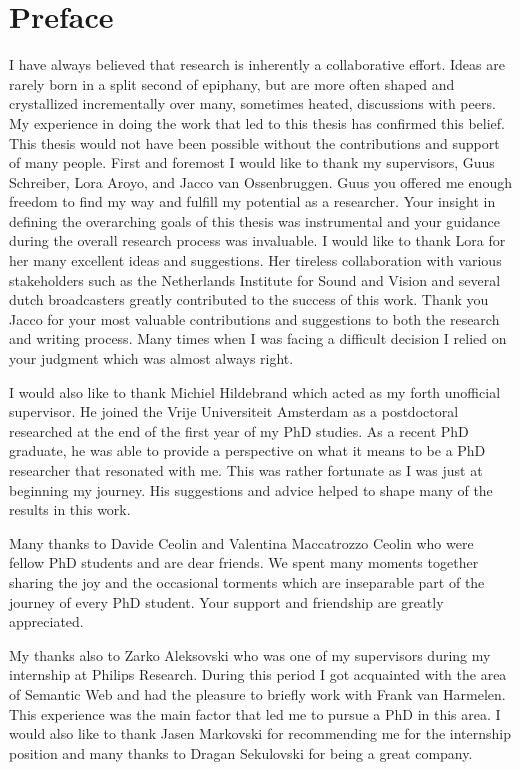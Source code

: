 \chapter{Preface}

I have always believed that research is inherently a collaborative effort. Ideas are rarely born in a split second of epiphany, but are more often shaped and crystallized incrementally over many, sometimes heated, discussions with peers. My experience in doing the work that led to this thesis has confirmed this belief. This thesis would not have been possible without the contributions and support of many people. First and foremost I would like to thank my supervisors, Guus Schreiber, Lora Aroyo, and Jacco van Ossenbruggen. Guus you offered me enough freedom to find my way and fulfill my potential as a researcher. Your insight in defining the overarching goals of this thesis was instrumental and your guidance during the overall research process was invaluable. I would like to thank Lora for her many excellent ideas and suggestions. Her tireless collaboration with various stakeholders such as the Netherlands Institute for Sound and Vision and several dutch broadcasters greatly contributed to the success of this work. Thank you Jacco for your most valuable contributions and suggestions to both the research and writing process. Many times when I was facing a difficult decision I relied on your judgment which was almost always right.

I would also like to thank Michiel Hildebrand which acted as my forth unofficial supervisor. He joined the Vrije Universiteit Amsterdam as a postdoctoral researched at the end of the first year of my PhD studies. As a recent PhD graduate, he was able to provide a perspective on what it means to be a PhD researcher that resonated with me.  This was rather fortunate as I was  just at beginning my journey. His suggestions and advice helped to shape many of the results in this work.

Many thanks to Davide Ceolin and Valentina Maccatrozzo Ceolin who were fellow PhD students and are dear friends. We spent many moments together sharing the joy and the occasional torments which are inseparable part of the journey of every PhD student. Your support and friendship are greatly appreciated.

My thanks also to Zarko Aleksovski who was one of my supervisors during my internship at Philips  Research. During this period I got acquainted with the area of Semantic Web and had the pleasure to briefly work with Frank van Harmelen. This experience was the main factor that led me to pursue a PhD in this area. I would also like to thank Jasen Markovski for recommending me for the internship position and many thanks to Dragan Sekulovski for being a great company.

